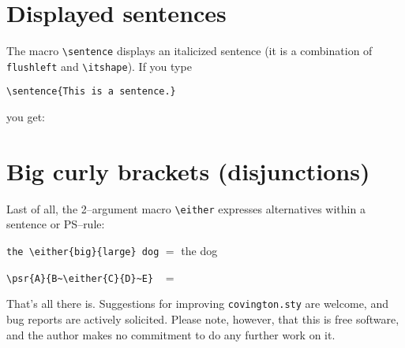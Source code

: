 \documentclass{article}
\begin{document}
\section{Displayed sentences}

The macro \verb"\sentence" displays an italicized sentence (it is a 
combination of \texttt{flushleft} and \verb"\itshape").  If you type
\begin{verbatim}
\sentence{This is a sentence.}
\end{verbatim}
you get:


\section{Big curly brackets (disjunctions)}

Last of all, the 2--argument macro \verb"\either" expresses alternatives
within a sentence or PS--rule:
\begin{flushleft}
\verb"the \either{big}{large} dog" $=$ the  dog \\
\end{flushleft}
\begin{flushleft}
\verb"\psr{A}{B~\either{C}{D}~E} " $=$ 
\end{flushleft}

That's all there is.
Suggestions for improving \texttt{covington.sty} are welcome, and bug
reports are actively solicited.  Please note, however, that this is free
software, and the author makes no commitment to do any further work on 
it.
\end{document}
